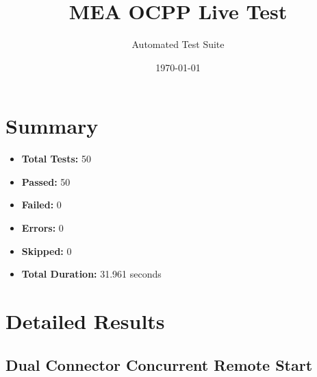 \documentclass{article}
\title{MEA OCPP Live Test}
\author{Automated Test Suite}
\date{\today}
\begin{document}
\maketitle

\section{Summary}
\begin{itemize}
    \item \textbf{Total Tests:} 50
    \item \textbf{Passed:} 50
    \item \textbf{Failed:} 0
    \item \textbf{Errors:} 0
    \item \textbf{Skipped:} 0
    \item \textbf{Total Duration:} 31.961 seconds
\end{itemize}

\section{Detailed Results}
\subsection{Dual Connector Concurrent Remote Start}
\end{document}
